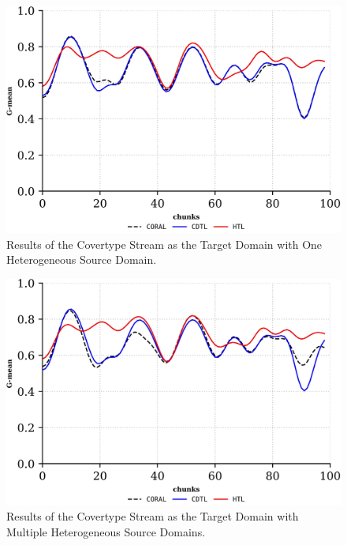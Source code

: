 \begin{figure}[!ht]
	\centering
	\includegraphics[width=1\linewidth]{6_transfer_learning/figures/exp2_0.png}
  \caption{Results of the Covertype Stream as the Target Domain with One Heterogeneous Source Domain.}

	\label{fig:6_exp3}
\end{figure}
\begin{figure}[!ht]
	\centering
	\includegraphics[width=1\linewidth]{6_transfer_learning/figures/exp2_1.png}
  \caption{Results of the Covertype Stream as the Target Domain with Multiple Heterogeneous Source Domains.}

	\label{fig:6_exp4}
\end{figure}
